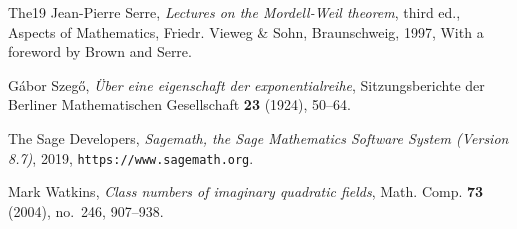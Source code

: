 \documentclass[12pt]{amsart}
\theoremstyle{plain} %
\theoremstyle{definition}
\theoremstyle{remark}
\numberwithin{equation}{section}
\begin{document}
\begin{thebibliography}{{The}19}
Jean-Pierre Serre, \emph{Lectures on the {M}ordell-{W}eil theorem}, third ed.,
  Aspects of Mathematics, Friedr. Vieweg \& Sohn, Braunschweig, 1997, With a
  foreword by Brown and Serre. 

G\'{a}bor Szeg\H{o}, \emph{\"{U}ber eine eigenschaft der exponentialreihe},
  Sitzungsberichte der Berliner Mathematischen Gesellschaft \textbf{23} (1924),
  50--64.

{The Sage Developers}, \emph{{S}agemath, the {S}age {M}athematics {S}oftware
  {S}ystem ({V}ersion 8.7)}, 2019, {\tt https://www.sagemath.org}.

Mark Watkins, \emph{Class numbers of imaginary quadratic fields}, Math. Comp.
  \textbf{73} (2004), no.~246, 907--938. 

\end{thebibliography}
\end{document}
